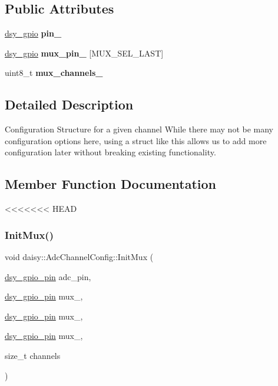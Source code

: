 \subsection*{Public Attributes}
\begin{DoxyCompactItemize}
\item 
\mbox{\label{structdaisy_1_1_adc_channel_config_aaa26b95be3383f04543b4525ab04389a}} 
\hyperlink{structdsy__gpio}{dsy\+\_\+gpio} {\bfseries pin\+\_\+}
\item 
\mbox{\label{structdaisy_1_1_adc_channel_config_ab617cb7700615026b926ff9675e8f90f}} 
\hyperlink{structdsy__gpio}{dsy\+\_\+gpio} {\bfseries mux\+\_\+pin\+\_\+} \mbox{[}M\+U\+X\+\_\+\+S\+E\+L\+\_\+\+L\+A\+ST\mbox{]}
\item 
\mbox{\label{structdaisy_1_1_adc_channel_config_a9e61599527b16d2a47c76f0e3fd8c45c}} 
uint8\+\_\+t {\bfseries mux\+\_\+channels\+\_\+}
\end{DoxyCompactItemize}


\subsection{Detailed Description}
Configuration Structure for a given channel While there may not be many configuration options here, using a struct like this allows us to add more configuration later without breaking existing functionality. 

\subsection{Member Function Documentation}
<<<<<<< HEAD
\mbox{\label{structdaisy_1_1_adc_channel_config_a03a0b5bae339d3479e6b3d635d293c61}} 
\subsubsection{\texorpdfstring{Init\+Mux()}{InitMux()}}
{\footnotesize\ttfamily void daisy\+::\+Adc\+Channel\+Config\+::\+Init\+Mux (\begin{DoxyParamCaption}\item[{\hyperlink{structdsy__gpio__pin}{dsy\+\_\+gpio\+\_\+pin}}]{adc\+\_\+pin,  }\item[{\hyperlink{structdsy__gpio__pin}{dsy\+\_\+gpio\+\_\+pin}}]{mux\+\_,  }\item[{\hyperlink{structdsy__gpio__pin}{dsy\+\_\+gpio\+\_\+pin}}]{mux\+\_,  }\item[{\hyperlink{structdsy__gpio__pin}{dsy\+\_\+gpio\+\_\+pin}}]{mux\+\_,  }\item[{size\+\_\+t}]{channels }\end{DoxyParamCaption})}

